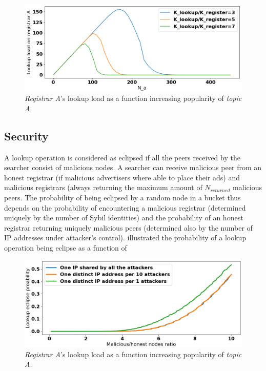 \begin{figure}[t]
    \includegraphics[width=1\linewidth]{img/fairness_lookup}
    \caption{\emph{Registrar A}'s lookup load as a function increasing popularity of \emph{topic A}.
    }
    \label{fig:fairness_lookup}
\end{figure}

\subsection{Security}

A lookup operation is considered as eclipsed if all the peers received by the searcher consist of malicious nodes. A searcher can receive malicious peer from an honest registrar (if malicious advertisers where able to place their ads) and malicious registrars (always returning the maximum amount of $N_\textit{returned}$ malicious peers. The probability of being eclipsed by a random node in a bucket thus depends on the probability of encountering a malicious registrar (determined uniquely by the number of Sybil identities) and the probability of an honest registrar returning uniquely malicious peers (determined also by the number of IP addresses under attacker's control).  illustrated the probability of a lookup operation being eclipse as a function of 

\begin{figure}[t]
    \includegraphics[width=1\linewidth]{img/eclipse_probability}
    \caption{\emph{Registrar A}'s lookup load as a function increasing popularity of \emph{topic A}.
    }
    \label{fig:eclipse_probability}
\end{figure}

